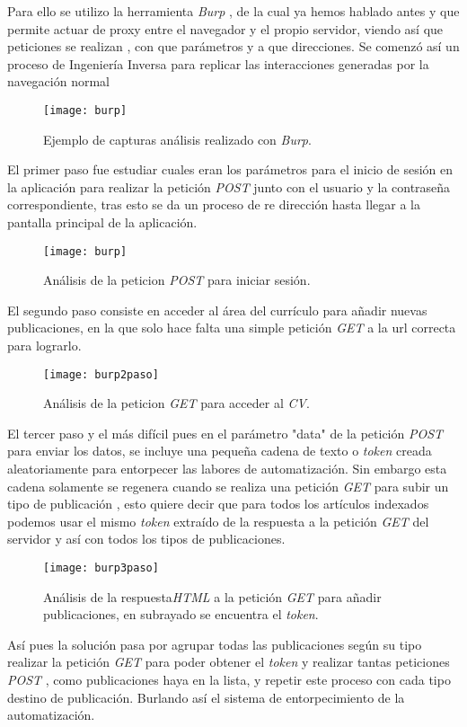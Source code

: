 	Para ello se utilizo la herramienta \emph{Burp} , de la cual ya hemos hablado antes y que permite actuar de proxy entre el navegador y el propio servidor, viendo así que peticiones se realizan , con que parámetros y a que direcciones. Se comenzó así un proceso de Ingeniería Inversa para replicar las interacciones generadas por la navegación normal \begin{figure}[H]
	\centering
	\texttt{[image: burp]}
	\caption{Ejemplo de capturas análisis realizado con \emph{Burp}.}
	\label{fig:burp}
\end{figure}
	El primer paso fue estudiar cuales eran los parámetros para el inicio de sesión en la aplicación para realizar la petición \emph{POST} junto con el usuario y la contraseña correspondiente, tras esto se da un proceso de re dirección hasta llegar a la pantalla principal de la aplicación.
\begin{figure}[H]
	\centering
	\texttt{[image: burp]}
	\caption{Análisis de la peticion \emph{POST} para iniciar sesión.}
	\label{fig:burp}
\end{figure}
	El segundo paso consiste en acceder al área del currículo para añadir nuevas publicaciones, en la que solo hace falta una simple petición \emph{GET} a la url correcta para lograrlo.
\begin{figure}[H]
	\centering
	\texttt{[image: burp2paso]}
	\caption{Análisis de la peticion \emph{GET} para acceder al \emph{CV}.}
	\label{fig:burp2paso}
\end{figure}
	El tercer paso y el más difícil pues en el parámetro "data" de la petición \emph{POST} para enviar los datos, se incluye una pequeña cadena de texto o \emph{token} creada aleatoriamente para entorpecer las labores de automatización. Sin embargo esta cadena solamente se regenera cuando se realiza una petición \emph{GET} para subir un tipo de publicación , esto quiere decir que para todos los artículos indexados podemos usar el mismo \emph{token} extraído de la respuesta a la petición \emph{GET} del servidor y así con todos los tipos de publicaciones.
\begin{figure}[H]
	\centering
	\texttt{[image: burp3paso]}
	\caption{Análisis de la respuesta\emph{HTML} a la petición \emph{GET} para añadir publicaciones, en subrayado se encuentra el \emph{token}.}
	\label{fig:burp3paso}
\end{figure}
	Así pues la solución pasa por agrupar todas las publicaciones según su tipo realizar la petición \emph{GET} para poder obtener el \emph{token} y realizar tantas peticiones \emph{POST} , como publicaciones haya en la lista, y repetir este proceso con cada tipo destino de publicación. Burlando así el sistema de entorpecimiento de la automatización.
